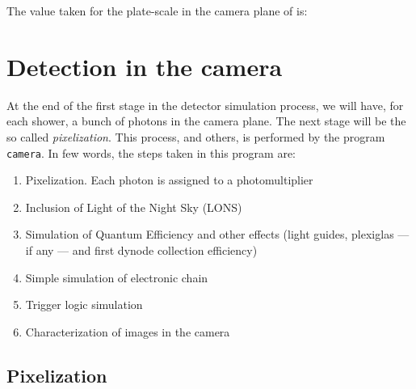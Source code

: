 The value taken for the plate-scale in the camera plane of \MAGIC is:
%
\platescaleeq

\zonefocalstbl

\zonesfig

\zonesfocalsfig

\randpoifig

\section{Detection in the camera}

At the end of the first stage in the detector simulation process, we
will have, for each shower, a bunch of photons in the camera plane.
The next stage will be the so called \emph{pixelization}.  This
process, and others, is performed by the program \texttt{camera}. In
few words, the steps taken in this program are:

\begin{enumerate}
\item Pixelization. Each photon is assigned to a photomultiplier

\item Inclusion of Light of the Night Sky (LONS)
  
\item Simulation of Quantum Efficiency and other effects (light
  guides, plexiglas --- if any --- and first dynode collection
  efficiency)

\item Simple simulation of electronic chain

\item Trigger logic simulation

\item Characterization of images in the camera
\end{enumerate}

\subsection{Pixelization}

